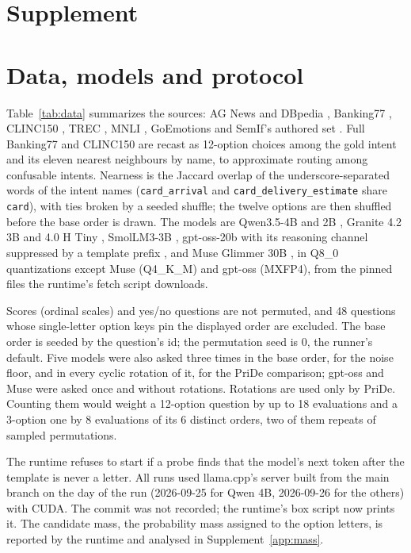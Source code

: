 \documentclass[10pt,twocolumn]{article}
\begin{document}



\appendix
\section*{Supplement}

\section{Data, models and protocol}
\label{app:data}
Table~\ref{tab:data} summarizes the sources: AG News and DBpedia \citep{zhang2015character}, Banking77 \citep{casanueva2020banking77}, CLINC150 \citep{larson2019clinc}, TREC \citep{li2002trec}, MNLI \citep{williams2018mnli}, GoEmotions \citep{demszky2020goemotions} and SemIf's authored set \citep{semif2026}. Full Banking77 and CLINC150 are recast as 12-option choices among the gold intent and its eleven nearest neighbours by name, to approximate routing among confusable intents. Nearness is the Jaccard overlap of the underscore-separated words of the intent names (\texttt{card\_arrival} and \texttt{card\_delivery\_estimate} share \texttt{card}), with ties broken by a seeded shuffle; the twelve options are then shuffled before the base order is drawn. The models are Qwen3.5-4B and 2B \citep{qwen35}, Granite 4.2 3B and 4.0 H Tiny \citep{granite4}, SmolLM3-3B \citep{smollm3}, gpt-oss-20b with its reasoning channel suppressed by a template prefix \citep{gptoss}, and Muse Glimmer 30B \citep{museglimmer}, in Q8\_0 quantizations except Muse (Q4\_K\_M) and gpt-oss (MXFP4), from the pinned files the runtime's fetch script downloads.

Scores (ordinal scales) and yes/no questions are not permuted, and 48 questions whose single-letter option keys pin the displayed order are excluded. The base order is seeded by the question's id; the permutation seed is 0, the runner's default. Five models were also asked three times in the base order, for the noise floor, and in every cyclic rotation of it, for the PriDe comparison; gpt-oss and Muse were asked once and without rotations. Rotations are used only by PriDe. Counting them would weight a 12-option question by up to 18 evaluations and a 3-option one by 8 evaluations of its 6 distinct orders, two of them repeats of sampled permutations.

The runtime refuses to start if a probe finds that the model's next token after the template is never a letter. All runs used llama.cpp's server built from the main branch on the day of the run (2026-09-25 for Qwen 4B, 2026-09-26 for the others) with CUDA. The commit was not recorded; the runtime's box script now prints it. The candidate mass, the probability mass assigned to the option letters, is reported by the runtime and analysed in Supplement~\ref{app:mass}.
\end{document}
